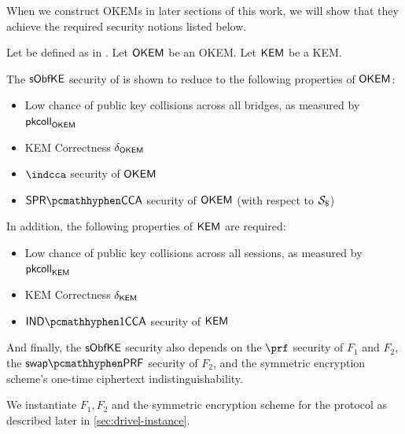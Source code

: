When we construct OKEMs in later sections of this work, we will show that they achieve the required security notions listed below.

\begin{theorem}
\label{thm:drivel-security}
    Let \drivel{} be defined as in \cite[Fig.~6]{EPRINT:GRSV25}. Let $\mathsf{OKEM}$ be an OKEM. Let $\mathsf{KEM}$ be a KEM.
    
    The $\mathsf{sObfKE}$ security of \drivel{} is shown to reduce to the following properties of $\mathsf{OKEM}$:
    \begin{itemize}
        \item Low chance of public key collisions across all bridges, as measured by $\mathsf{pkcoll}_{\mathsf{OKEM}}$
        \item KEM Correctness $\delta_{\mathsf{OKEM}}$
        \item $\indcca$ security of $\mathsf{OKEM}$
        \item $\sprcca$ security of $\mathsf{OKEM}$ (with respect to $\simulbin$)
    \end{itemize}

    In addition, the following properties of $\mathsf{KEM}$ are required:
    \begin{itemize}
        \item Low chance of public key collisions across all sessions, as measured by $\mathsf{pkcoll}_{\mathsf{KEM}}$
        \item KEM Correctness $\delta_{\mathsf{KEM}}$
        \item $\indonecca$ security of $\mathsf{KEM}$
    \end{itemize}

    And finally, the $\mathsf{sObfKE}$ security also depends on the $\prf$ security of $F_1$ and $F_2$, the $\swapprf$ security of $F_2$, and the symmetric encryption scheme's one-time ciphertext indistinguishability.
\end{theorem}

We instantiate $F_1,F_2$ and the symmetric encryption scheme for the \drivel{} protocol as described later in \cref{sec:drivel-instance}.

